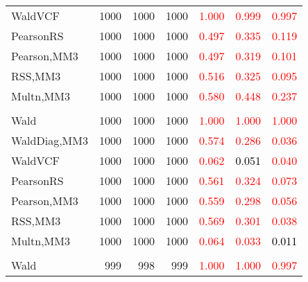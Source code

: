 \documentclass[
]{article}
\begin{document}
\begin{table}[H]
{\begin{tabular}[t]{lrrrrrr}
\hspace{1em}WaldVCF & 1000 & 1000 & 1000 & \textcolor{red}{1.000} & \textcolor{red}{0.999} & \textcolor{red}{0.997}\\
\hspace{1em}PearsonRS & 1000 & 1000 & 1000 & \textcolor{red}{0.497} & \textcolor{red}{0.335} & \textcolor{red}{0.119}\\
\hspace{1em}Pearson,MM3 & 1000 & 1000 & 1000 & \textcolor{red}{0.497} & \textcolor{red}{0.319} & \textcolor{red}{0.101}\\
\hspace{1em}RSS,MM3 & 1000 & 1000 & 1000 & \textcolor{red}{0.516} & \textcolor{red}{0.325} & \textcolor{red}{0.095}\\
\hspace{1em}Multn,MM3 & 1000 & 1000 & 1000 & \textcolor{red}{0.580} & \textcolor{red}{0.448} & \textcolor{red}{0.237}\\
\addlinespace[0.3em]
\multicolumn{7}{l}{\textbf{1F 15V}}\\
\hspace{1em}Wald & 1000 & 1000 & 1000 & \textcolor{red}{1.000} & \textcolor{red}{1.000} & \textcolor{red}{1.000}\\
\hspace{1em}WaldDiag,MM3 & 1000 & 1000 & 1000 & \textcolor{red}{0.574} & \textcolor{red}{0.286} & \textcolor{red}{0.036}\\
\hspace{1em}WaldVCF & 1000 & 1000 & 1000 & \textcolor{red}{0.062} & \textcolor{black}{0.051} & \textcolor{red}{0.040}\\
\hspace{1em}PearsonRS & 1000 & 1000 & 1000 & \textcolor{red}{0.561} & \textcolor{red}{0.324} & \textcolor{red}{0.073}\\
\hspace{1em}Pearson,MM3 & 1000 & 1000 & 1000 & \textcolor{red}{0.559} & \textcolor{red}{0.298} & \textcolor{red}{0.056}\\
\hspace{1em}RSS,MM3 & 1000 & 1000 & 1000 & \textcolor{red}{0.569} & \textcolor{red}{0.301} & \textcolor{red}{0.038}\\
\hspace{1em}Multn,MM3 & 1000 & 1000 & 1000 & \textcolor{red}{0.064} & \textcolor{red}{0.033} & \textcolor{black}{0.011}\\
\addlinespace[0.3em]
\multicolumn{7}{l}{\textbf{2F 10V}}\\
\hspace{1em}Wald & 999 & 998 & 999 & \textcolor{red}{1.000} & \textcolor{red}{1.000} & \textcolor{red}{0.997}\\

\end{tabular}}
\end{table}
\end{document}
